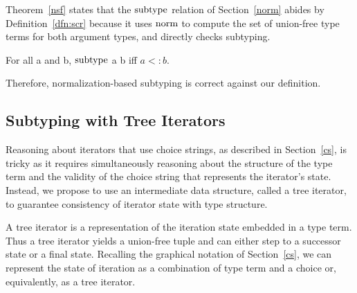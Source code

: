 \documentclass[a4paper,english]{lipics-v2019}
\renewcommand{\c}[1]{\ensuremath{\text{\lstinline{#1}}}\xspace}
\begin{document}
\noindent
Theorem~\ref{nsf} states that the \c{subtype} relation of
Section~\ref{norm} abides by Definition~\ref{dfn:scr} because it uses
\c{norm} to compute the set of union-free type terms for both argument
types, and directly checks subtyping.

\begin{theorem}[NF Subtyping]\label{nsf}
For all  a and b, \c{subtype} a b iff $a <: b$.
\end{theorem}

\noindent
Therefore, normalization-based subtyping is correct against our definition.


\subsection{Subtyping with Tree Iterators}

Reasoning about iterators that use choice strings, as described in
Section~\ref{cs}, is tricky as it requires simultaneously reasoning about
the structure of the type term and the validity of the choice string that
represents the iterator's state. Instead, we propose to use an intermediate
data structure, called a tree iterator, to guarantee consistency of iterator
state with type structure.

A tree iterator is a representation of the iteration state embedded in a type
term. Thus a tree iterator yields a union-free tuple and can either step to a
successor state or a final state. Recalling the graphical notation of
Section~\ref{cs}, we can represent the state of iteration as a combination of
type term and a choice or, equivalently, as a tree iterator.
\end{document}
